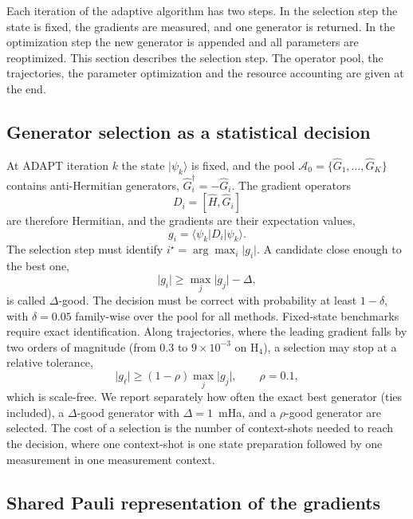 \documentclass[aps,pra,reprint,superscriptaddress,nofootinbib]{revtex4-2}
\begin{document}
Each iteration of the adaptive algorithm has two steps. In the selection step the state is fixed, the gradients are measured, and one generator is returned. In the optimization step the new generator is appended and all parameters are reoptimized. This section describes the selection step. The operator pool, the trajectories, the parameter optimization and the resource accounting are given at the end.

\subsection{Generator selection as a statistical decision}

At ADAPT iteration $k$ the state $\lvert\psi_k\rangle$ is fixed, and the pool $\mathcal A_0=\{\hat G_1,\dots,\hat G_K\}$ contains anti-Hermitian generators, $\hat G_i^\dagger=-\hat G_i$. The gradient operators
\begin{equation}
D_i=[\hat H,\hat G_i]
\end{equation}
are therefore Hermitian, and the gradients are their expectation values,
\begin{equation}
g_i=\langle\psi_k\rvert D_i\lvert\psi_k\rangle .
\end{equation}
The selection step must identify $i^\star=\arg\max_i\lvert g_i\rvert$. A candidate close enough to the best one,
\begin{equation}
\lvert g_i\rvert\ge\max_j\lvert g_j\rvert-\Delta ,
\label{eq:dgood}
\end{equation}
is called $\Delta$-good. The decision must be correct with probability at least $1-\delta$, with $\delta=0.05$ family-wise over the pool for all methods. Fixed-state benchmarks require exact identification. Along trajectories, where the leading gradient falls by two orders of magnitude (from $0.3$ to $9\times10^{-3}$ on H$_4$), a selection may stop at a relative tolerance,
\begin{equation}
\lvert g_\ell\rvert\ge(1-\rho)\max_j\lvert g_j\rvert ,\qquad \rho=0.1 ,
\label{eq:rhogood}
\end{equation}
which is scale-free. We report separately how often the exact best generator (ties included), a $\Delta$-good generator with $\Delta=1$~mHa, and a $\rho$-good generator are selected. The cost of a selection is the number of context-shots needed to reach the decision, where one context-shot is one state preparation followed by one measurement in one measurement context.

\subsection{Shared Pauli representation of the gradients}
\end{document}
